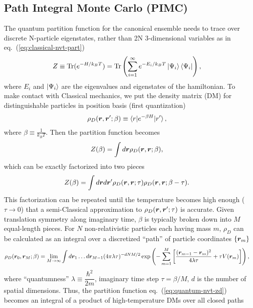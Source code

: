 \subsection{Path Integral Monte Carlo (PIMC)}
The quantum partition function for the canonical ensemble needs to trace over discrete N-particle eigenstates, rather than 2N 3-dimensional variables as in eq.~(\ref{eq:classical-nvt-part})
\begin{align}
Z\equiv \text{Tr}(e^{-H/k_BT})=\text{Tr}\left(
\sum\limits_{i=1}^{\infty} e^{-E_i/k_BT}\ket{\Psi_i}\bra{\Psi_i}
\right),
\end{align}
where $E_i$ and $\ket{\Psi_i}$ are the eigenvalues and eigenstates of the hamiltonian. To make contact with Classical mechanics, we put the density matrix (DM) for distinguishable particles in position basis (first quantization)
\begin{align}
\rho_D(\boldsymbol{r}, \boldsymbol{r}'; \beta) \equiv \braket{r|e^{-\beta H}|r'},
\end{align}
where $\beta\equiv \frac{1}{k_B T}$. 
Then the partition function becomes
\begin{align} \label{eq:quantum-nvt-zd}
Z(\beta) = \int d\boldsymbol{r} \rho_D(\boldsymbol{r},\boldsymbol{r};\beta),
\end{align}
which can be exactly factorized into two pieces
\begin{align}
Z(\beta) = \int d\boldsymbol{r}d\boldsymbol{r}' \rho_D(\boldsymbol{r},\boldsymbol{r};\tau)\rho_D(\boldsymbol{r},\boldsymbol{r};\beta-\tau).
\end{align}
This factorization can be repeated until the temperature becomes high enough ($\tau\rightarrow0$) that a semi-Classical approximation to $\rho_D(\boldsymbol{r},\boldsymbol{r}';\tau)$ is accurate. Given translation symmetry along imaginary time, $\beta$ is typically broken down into $M$ equal-length pieces.
For $N$ non-relativistic particles each having mass $m$, $\rho_D$ can be calculated as an integral over a discretized ``path'' of particle coordinates $\{\boldsymbol{r}_m\}$
\begin{align} \label{eq:pimc-rhod}
\rho_D(\boldsymbol{r}_0,\boldsymbol{r}_M;\beta) = \lim\limits_{M\rightarrow\infty} \int d\boldsymbol{r}_1\dots d\boldsymbol{r}_{M-1}
(4\pi\lambda\tau)^{-dNM/2}\exp\left(
-\sum\limits_{m=1}^M \left[
\dfrac{(\boldsymbol{r}_{m-1}-\boldsymbol{r}_m)^2}{4\lambda\tau} + \tau V(\boldsymbol{r}_m)
\right]
\right),
\end{align}
where ``quantumness'' $\lambda\equiv\dfrac{\hbar^2}{2m}$, imaginary time step $\tau=\beta/M$, $d$ is the number of spatial dimensions. Thus, the partition function eq.~(\ref{eq:quantum-nvt-zd}) becomes an integral of a product of high-temperature DMs over all closed paths

